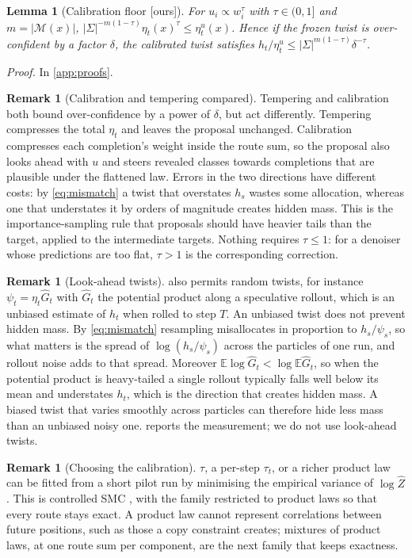 \documentclass[11pt]{article}
\newtheorem{lemma}[theorem]{Lemma}
\theoremstyle{definition}
\newtheorem{remark}[theorem]{Remark}
\newcommand{\M}{\mathcal{M}}
\newcommand{\E}{\mathbb{E}}
\newcommand{\Zh}{\widehat Z}
\newcommand{\status}[1]{\textsf{\small[#1]}}
\newcommand{\proofref}[1]{\par\noindent\textit{Proof.} #1\par\smallskip}
\begin{document}
\begin{lemma}[Calibration floor \status{ours}]\label{lem:floor}
For $u_i\propto w_i^\tau$ with $\tau\in(0,1]$ and $m=|\M(x)|$,
$|\Sigma|^{-m(1-\tau)}\eta_t(x)^\tau\le\eta^u_t(x)$. Hence if the frozen twist is over-confident by a factor
$\delta$, the calibrated twist satisfies $h_t/\eta^u_t\le|\Sigma|^{m(1-\tau)}\delta^{-\tau}$.
\end{lemma}
\proofref{In \cref{app:proofs}.}

\begin{remark}[Calibration and tempering compared]
Tempering and calibration both bound over-confidence by a power of $\delta$, but act differently. Tempering
compresses the total $\eta_t$ and leaves the proposal unchanged. Calibration compresses each completion's weight
inside the route sum, so the proposal also looks ahead with $u$ and steers revealed classes towards completions
that are plausible under the flattened law. Errors in the two directions have different costs: by
\eqref{eq:mismatch} a twist that overstates $h_s$ wastes some allocation, whereas one that understates it by
orders of magnitude creates hidden mass. This is the importance-sampling rule that proposals should have heavier
tails than the target, applied to the intermediate targets. Nothing requires $\tau\le1$: for a denoiser whose
predictions are too flat, $\tau>1$ is the corresponding correction.
\end{remark}

\begin{remark}[Look-ahead twists]
 also permits random twists, for instance $\psi_t=\eta_t\hat G_t$ with $\hat G_t$ the potential
product along a speculative rollout, which is an unbiased estimate of $h_t$ when rolled to step $T$. An unbiased
twist does not prevent hidden mass. By \eqref{eq:mismatch} resampling misallocates in proportion to $h_s/\psi_s$,
so what matters is the spread of $\log(h_s/\psi_s)$ across the particles of one run, and rollout noise adds to
that spread. Moreover $\E\log\hat G_t<\log\E\hat G_t$, so when the potential product is heavy-tailed a single
rollout typically falls well below its mean and understates $h_t$, which is the direction that creates hidden
mass. A biased twist that varies smoothly across particles can therefore hide less mass than an unbiased noisy
one.  reports the measurement; we do not use look-ahead twists.
\end{remark}

\begin{remark}[Choosing the calibration]
$\tau$, a per-step $\tau_t$, or a richer product law can be fitted from a short pilot run by minimising the
empirical variance of $\log\Zh$. This is controlled SMC \cite{heng2020}, with the family restricted to product
laws so that every route stays exact. A product law cannot represent correlations between future positions, such
as those a copy constraint creates; mixtures of product laws, at one route sum per component, are the next family
that keeps exactness.
\end{remark}
\end{document}
